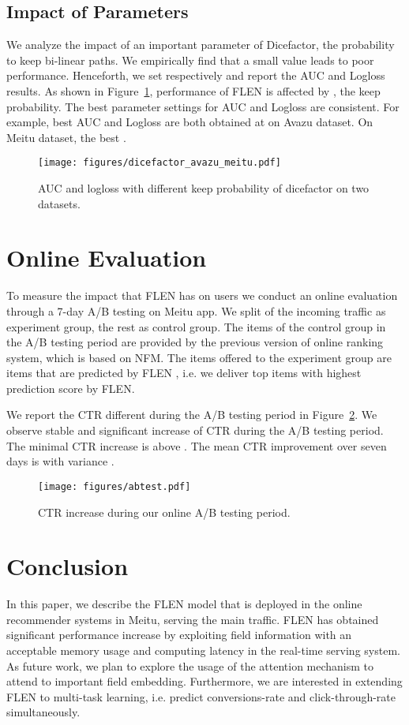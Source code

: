 \documentclass[sigconf]{acmart}
\begin{document}
\subsection{Impact of Parameters}
We analyze the impact of an important parameter of Dicefactor, the probability  to keep bi-linear paths. 
We empirically find that a small value  leads to poor performance.
Henceforth, we set  respectively and report the AUC and Logloss results.  
As shown in Figure~\ref{fig:dicefactor}, performance of FLEN is affected by , the keep probability. 
The best parameter settings for AUC and Logloss are consistent. For example, best AUC and Logloss are both obtained at  on Avazu dataset. On Meitu dataset, the best . 

\begin{figure}
\centering\texttt{[image: figures/dicefactor\_avazu\_meitu.pdf]}
\caption{AUC and logloss with different keep probability of dicefactor on two datasets. }
\label{fig:dicefactor}
\end{figure}


\section{Online Evaluation}

To measure the impact that FLEN has on users we conduct an online evaluation through a 7-day A/B testing on Meitu app. We split  of the incoming traffic as experiment group, the rest as control group. 
The items of the control group in the A/B testing period are provided by the previous version of online ranking system, which is based on NFM. 
The items offered to the experiment group are items that are predicted by FLEN , i.e. we deliver top  items with highest prediction score by FLEN. 

We report the CTR different during the A/B testing period in Figure~\ref{fig:online}. 
We observe stable and significant increase of CTR during the A/B testing period. 
The minimal CTR increase is above . The mean CTR improvement over seven days is  with variance .
\begin{figure}[htbp]
\centering\texttt{[image: figures/abtest.pdf]}
\caption{CTR increase during our online A/B testing period.}
\label{fig:online}
\end{figure}

\section{Conclusion}
In this paper, we describe the FLEN model that is deployed in the online recommender systems in Meitu, serving the main traffic. FLEN has obtained significant performance increase by exploiting field information with an acceptable memory usage and computing latency in the real-time serving system. 
As future work, we plan to explore the usage of the attention mechanism to attend to important field embedding. Furthermore, we are interested in extending FLEN to  multi-task learning, i.e. predict conversions-rate and click-through-rate simultaneously. 
\end{document}
